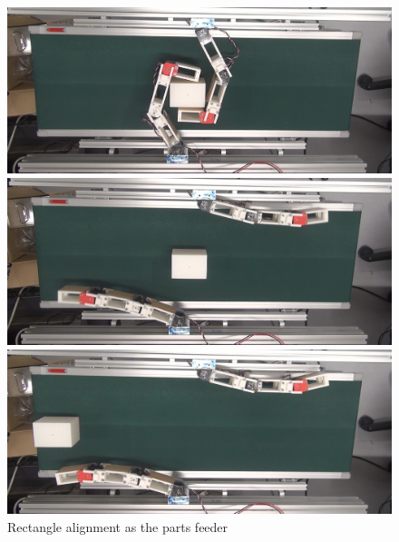 \documentclass[a4paper,twoside,12pt,papersize, dvipdfmx]{iirthesis}
\begin{document}
\begin{figure}[hb]
\begin{minipage}{0.49\hsize}
\includegraphics[width=0.98\hsize]{fig/4-manipulation-result/Rectangle/3-4.jpg}
\subcaption{}
\end{minipage}\hfill
\begin{minipage}{0.49\hsize}
\includegraphics[width=0.98\hsize]{fig/4-manipulation-result/Rectangle/3-5.jpg}
\subcaption{}
\end{minipage}\hfill
\begin{minipage}{0.49\hsize}
\includegraphics[width=0.98\hsize]{fig/4-manipulation-result/Rectangle/3-6.jpg}
\subcaption{}
\end{minipage}\hfill
\caption{Rectangle alignment as the parts feeder}\label{fig::result::rp}
\end{figure}
\end{document}
